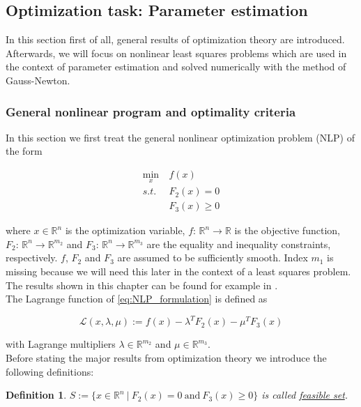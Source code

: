 \documentclass{scrartcl}[12pt, halfparskip]
\numberwithin{equation}{section}
\numberwithin{figure}{section}
\numberwithin{table}{section}
\newtheorem{Definition}{Definition}
\begin{document}
\subsection{Optimization task: Parameter estimation}

In this section first of all, general results of optimization theory are introduced. Afterwards, we will focus on nonlinear least squares problems which are used in the context of parameter estimation and solved numerically with the method of Gauss-Newton.

\subsubsection{General nonlinear program and optimality criteria}
\label{sec:optimization_theory_NLP}
In this section we first treat the general nonlinear optimization problem (NLP) of the form

\begin{align}
	\min_x & \ f(x) \label{eq:NLP_formulation} \\
	s.t. & \ F_2(x) = 0 \nonumber \\
	& \ F_3(x) \ge 0 \nonumber
\end{align}

where $x \in \mathbb{R}^n$ is the optimization variable, $f\text{: } \mathbb{R}^n \rightarrow \mathbb{R}$ is the objective function, $F_2\text{: } \mathbb{R}^n \rightarrow \mathbb{R}^{m_2}$ and $F_3\text{: } \mathbb{R}^n \rightarrow \mathbb{R}^{m_3}$ are the equality and inequality constraints, respectively. $f$, $F_2$ and $F_3$ are assumed to be sufficiently smooth. Index $m_1$ is missing because we will need this later in the context of a least squares problem. The results shown in this chapter can be found for example in \cite{nonlinear_optimiziation_wright}. \\

The Lagrange function of \cref{eq:NLP_formulation} is defined as

\begin{equation}
	\mathcal{L}(x,\lambda,\mu) := f(x) - \lambda^T F_2(x) - \mu^T F_3(x)
\end{equation}

with Lagrange multipliers $\lambda \in \mathbb{R}^{m_2}$ and $\mu \in \mathbb{R}^{m_3}$. \\

Before stating the major results from optimization theory we introduce the following definitions:

\begin{Definition}
	$S := \{ x \in \mathbb{R}^n \ | \ F_2(x) = 0 \ \text{and} \ F_3(x) \ge 0 \}$ is called \underline{feasible set}.
\end{Definition}
\end{document}
